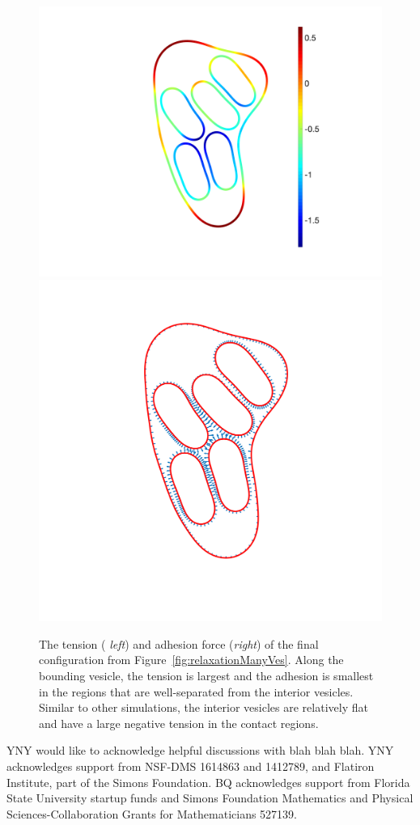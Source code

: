 \documentclass[prf,superscriptaddress,showpacs]{revtex4-1}
\begin{document}
\begin{figure}[htp]
\centering
\includegraphics[height=0.4\textwidth]{figs/relaxationManyVesTension.png}
\includegraphics[height=0.4\textwidth]{figs/relaxationManyVesAdhesion.png}
\caption{\label{fig:relaxationManyVesAdhesionTension} The tension ({\em
left}) and adhesion force ({\em right}) of the final configuration from
Figure~\ref{fig:relaxationManyVes}.  Along the bounding vesicle, the
tension is largest and the adhesion is smallest in the regions that are
well-separated from the interior vesicles.  Similar to other
simulations, the interior vesicles are relatively flat and have a large
negative tension in the contact regions.}
\end{figure}



\acknowledgments

YNY would like to acknowledge helpful discussions with blah blah blah.
YNY acknowledges support from NSF-DMS 1614863 and 1412789, and Flatiron
Institute, part of the Simons Foundation.  BQ acknowledges support from
Florida State University startup funds and Simons Foundation Mathematics
and Physical Sciences-Collaboration Grants for Mathematicians 527139.
\end{document}
